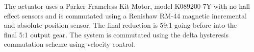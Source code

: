 The actuator uses a Parker Frameless Kit Motor, model K089200-7Y with no hall effect sensors and is commutated using a Renishaw RM-44 magnetic incremental and absolute position sensor. The final reduction is 59:1 going before into the final 5:1 output gear. The system is commutated using the delta hysteresis commutation scheme \cite{electric_machines} using velocity control. 
